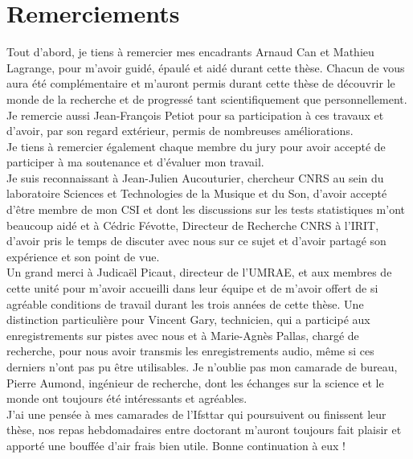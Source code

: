 \chapter*{Remerciements}

Tout d'abord, je tiens à remercier mes encadrants Arnaud Can et Mathieu Lagrange, pour m'avoir guidé, épaulé et aidé durant cette thèse. Chacun de vous aura été complémentaire et m'auront permis durant cette thèse de découvrir le monde de la recherche et de progressé tant scientifiquement que personnellement.\\
 
Je remercie aussi Jean-François Petiot pour sa participation à ces travaux et d'avoir, par son regard extérieur, permis de nombreuses améliorations.\\

Je tiens à remercier également chaque membre du jury pour avoir accepté de participer à ma soutenance et d'évaluer mon travail.\\

Je suis reconnaissant à Jean-Julien Aucouturier, chercheur CNRS au sein du laboratoire Sciences et Technologies de la Musique et du Son, d'avoir accepté d'être membre de mon CSI et dont les discussions sur les tests statistiques m'ont beaucoup aidé et à Cédric Févotte, Directeur de Recherche CNRS à l'IRIT, d'avoir pris le temps de discuter avec nous sur ce sujet et d'avoir partagé son expérience et son point de vue.\\

Un grand merci à Judicaël Picaut, directeur de l'UMRAE, et aux membres de cette unité pour m'avoir accueilli dans leur équipe et de m'avoir offert de si agréable conditions de travail durant les trois années de cette thèse. Une distinction particulière pour Vincent Gary, technicien, qui a participé aux enregistrements sur pistes avec nous et à Marie-Agnès Pallas, chargé de recherche, pour nous avoir transmis les enregistrements audio, même si ces derniers n'ont pas pu être utilisables. Je n'oublie pas mon camarade de bureau, Pierre Aumond, ingénieur de recherche, dont les échanges sur la science et le monde ont toujours été intéressants et agréables.\\

J'ai une pensée à mes camarades de l'Ifsttar qui poursuivent ou finissent leur thèse, nos repas hebdomadaires entre doctorant m'auront toujours fait plaisir et apporté une bouffée d'air frais bien utile. Bonne continuation à eux !\\

